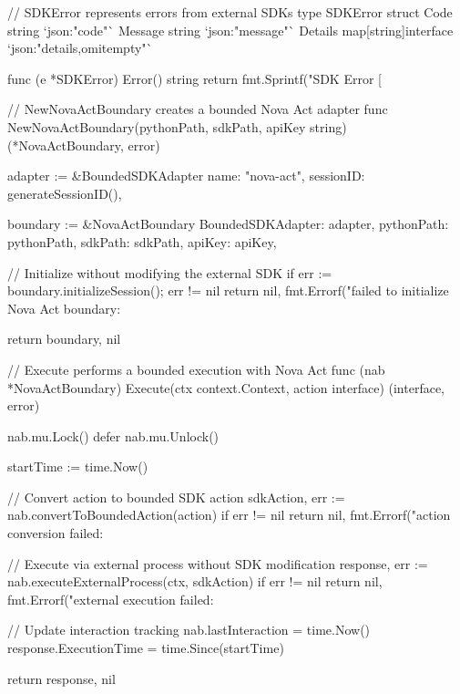 // SDKError represents errors from external SDKs
type SDKError struct {
    Code    string `json:"code"`
    Message string `json:"message"`
    Details map[string]interface{} `json:"details,omitempty"`
}

func (e *SDKError) Error() string {
    return fmt.Sprintf("SDK Error [%
}

// NewNovaActBoundary creates a bounded Nova Act adapter
func NewNovaActBoundary(pythonPath, sdkPath, apiKey string) (*NovaActBoundary, error) {
    adapter := &BoundedSDKAdapter{
        name:       "nova-act",
        sessionID:  generateSessionID(),
    }

    boundary := &NovaActBoundary{
        BoundedSDKAdapter: adapter,
        pythonPath:        pythonPath,
        sdkPath:          sdkPath,
        apiKey:           apiKey,
    }

    // Initialize without modifying the external SDK
    if err := boundary.initializeSession(); err != nil {
        return nil, fmt.Errorf("failed to initialize Nova Act boundary: %
    }

    return boundary, nil
}

// Execute performs a bounded execution with Nova Act
func (nab *NovaActBoundary) Execute(ctx context.Context, action interface{}) (interface{}, error) {
    nab.mu.Lock()
    defer nab.mu.Unlock()

    startTime := time.Now()

    // Convert action to bounded SDK action
    sdkAction, err := nab.convertToBoundedAction(action)
    if err != nil {
        return nil, fmt.Errorf("action conversion failed: %
    }

    // Execute via external process without SDK modification
    response, err := nab.executeExternalProcess(ctx, sdkAction)
    if err != nil {
        return nil, fmt.Errorf("external execution failed: %
    }

    // Update interaction tracking
    nab.lastInteraction = time.Now()
    response.ExecutionTime = time.Since(startTime)

    return response, nil
}


